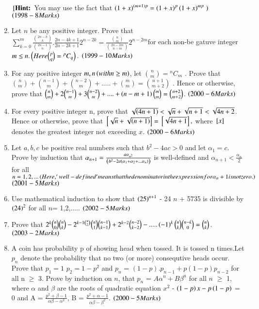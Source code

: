 \documentclass[journal,12pt,twocolumn]{IEEEtran}
\theoremstyle{remark}
\begin{document}
\begin{enumerate}[start=16]
		${}\left[\textbf{Hint:}\right.$ You may use the fact that $\left(1+x\right)^{\left(m+1\right)p} = \left(1+x\right)^p\left(1+x\right)^ {mp} \left.\right)$
$\hfill\textcolor{black}{\brak{1998-8 Marks} }$
\item 
Let $n$ be any positive integer. Prove that $\sum\limits^{m}_{k=0}\frac{\binom{2n-k}{k}}{\binom{2n-1}{n}}.\frac{2n-4k+1}{2n-2k+1}2^{n-2k}= \frac{\binom{n}{m}}{\binom{2n-2m}{n-m} } 2^{n-2m}$for each non-be gatuve integer $m\leq n. \left(Here \binom{p}{q} = {}^pC_q\right).$
$\hfill\textcolor{black}{\brak{1999-10 Marks} }$
\item
For any positive integer $m,n\left(with n \geq m\right)$, let $\binom{n}{m} ={}^nC_m$ . Prove that $\binom{n}{m} + \binom{n-1}{m} + \binom{n-2}{m} + ..... + \binom{m}{m} = \binom{n+1}{m+2}$ . Hence or otherwise, prove that $\binom{n}{m} +2\binom{n-1}{m} +3\binom{n-2}{m}+....+ \left(n-m+1\right) \binom{m}{m} = \binom{n+2}{m+2}$.
$\hfill\textcolor{black}{\brak{2000-6 Marks} }$
\item
For every positive integer n, prove that $\sqrt{\left(4n+1\right)} < \sqrt{n} +\sqrt{n+1} < \sqrt{4n+2}$. Hence or otherwise, prove that ${}\left[\sqrt{n} + \sqrt{\left(n+1\right)}\right]= {}\left[\sqrt{4n+1}\right],$ where ${}\left[x\right]$ denotes the greatest integer not exceeding $x$.
$\hfill\textcolor{black}{\brak{2000-6 Marks} }$
\item
Let $a,b,c$ be positive real numbers such that $b^2 - 4ac > 0$ and let $\alpha_1 = c$. Prove by induction that $\alpha_{n+1} = \frac{a \alpha_{n^2}}{\left(b^2 - 2a \left(\alpha_1 + \alpha_2 + ... \alpha_n\right)\right)}$ is well-defined and $\alpha_{n+1} < \frac{\alpha_n}{2}$ for all $n = 1,2,... \left(Here,'well-defined' means that the denominator in the expression for \alpha_n+1 is not zero.\right)$
$\hfill\textcolor{black}{\brak{2001-5 Marks} }$
\item
Use mathematical induction to show that $\left(25\right)^{n+1}$ - 24 $n$ + 5735 is divisible by $\left(24\right)^2$ for all $n$= 1,2,.....
$\hfill\textcolor{black}{\brak{2002-5 Marks} }$
\item 
Prove that $2^k \binom{n}{0}\binom{n}{k} - 2^{k-1\binom{n}{2}} \binom{n}{1} \binom{n-1}{k-1} + 2^{k-2}\binom{n-2}{k-2} - .....\left(-1\right)^k \binom{n}{k}\binom{n-k}{0} = \binom{n}{k}$.
$\hfill\textcolor{black}{\brak{2003-2 Marks} }$
\item
A coin has probability p of showing head when tossed. It is tossed n times.Let $p_n$ denote the probability that no two (or more) consequtive heads occur. Prove that $p_1=1$ $p_2=1-p^2$ and $p_n$ = $(1-p).p_{n-1} + p(1-p)p_{n-2}$ for all n $\geq$ 3. Prove by induction on $n$, that $p_n$ = $A\alpha^n + B\beta^n$ for all $n$ $\geq$ 1, where $\alpha$ and $\beta$ are the roots of quadratic equation $x^2$ - $\left(1-p\right)x - p\left(1-p\right)$ = 0 and A = $\frac{p^2 + \beta -1}{\alpha\beta-\alpha^2}$, B = $\frac{p^2 + \alpha -1}{\alpha\beta - \beta^2}$.
$\hfill\textcolor{black}{\brak{2000-5 Marks} }$



\end{enumerate}
\end{document}
